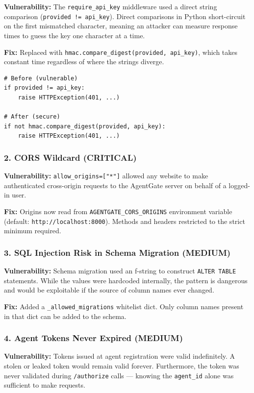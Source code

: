 \documentclass[12pt, a4paper]{article}
\begin{document}
\textbf{Vulnerability:} The \texttt{require\_api\_key} middleware used a direct
string comparison (\texttt{provided != api\_key}). Direct comparisons in Python
short-circuit on the first mismatched character, meaning an attacker can
measure response times to guess the key one character at a time.

\textbf{Fix:} Replaced with \texttt{hmac.compare\_digest(provided, api\_key)},
which takes constant time regardless of where the strings diverge.

\begin{verbatim}
# Before (vulnerable)
if provided != api_key:
    raise HTTPException(401, ...)

# After (secure)
if not hmac.compare_digest(provided, api_key):
    raise HTTPException(401, ...)
\end{verbatim}

\subsubsection{2. CORS Wildcard (CRITICAL)}

\textbf{Vulnerability:} \texttt{allow\_origins=["*"]} allowed any website to
make authenticated cross-origin requests to the AgentGate server on behalf of
a logged-in user.

\textbf{Fix:} Origins now read from \texttt{AGENTGATE\_CORS\_ORIGINS}
environment variable (default: \texttt{http://localhost:8000}). Methods and
headers restricted to the strict minimum required.

\subsubsection{3. SQL Injection Risk in Schema Migration (MEDIUM)}

\textbf{Vulnerability:} Schema migration used an f-string to construct
\texttt{ALTER TABLE} statements. While the values were hardcoded internally,
the pattern is dangerous and would be exploitable if the source of column
names ever changed.

\textbf{Fix:} Added a \texttt{\_allowed\_migrations} whitelist dict. Only
column names present in that dict can be added to the schema.

\subsubsection{4. Agent Tokens Never Expired (MEDIUM)}

\textbf{Vulnerability:} Tokens issued at agent registration were valid
indefinitely. A stolen or leaked token would remain valid forever. Furthermore,
the token was never validated during \texttt{/authorize} calls — knowing the
\texttt{agent\_id} alone was sufficient to make requests.
\end{document}

